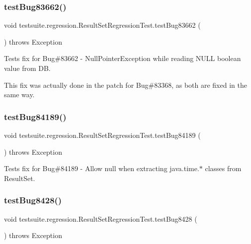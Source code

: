 \subsubsection{\texorpdfstring{test\+Bug83662()}{testBug83662()}}
{\footnotesize\ttfamily void testsuite.\+regression.\+Result\+Set\+Regression\+Test.\+test\+Bug83662 (\begin{DoxyParamCaption}{ }\end{DoxyParamCaption}) throws Exception}

Tests fix for Bug\#83662 -\/ Null\+Pointer\+Exception while reading N\+U\+LL boolean value from DB.

This fix was actually done in the patch for Bug\#83368, as both are fixed in the same way. \mbox{\label{classtestsuite_1_1regression_1_1_result_set_regression_test_af965cfa28edc223aede9f2583526cc38}} 
\subsubsection{\texorpdfstring{test\+Bug84189()}{testBug84189()}}
{\footnotesize\ttfamily void testsuite.\+regression.\+Result\+Set\+Regression\+Test.\+test\+Bug84189 (\begin{DoxyParamCaption}{ }\end{DoxyParamCaption}) throws Exception}

Tests fix for Bug\#84189 -\/ Allow null when extracting java.\+time.$\ast$ classes from Result\+Set. \mbox{\label{classtestsuite_1_1regression_1_1_result_set_regression_test_a195b8d1a9669b382f6b4dc0b8866224c}} 
\subsubsection{\texorpdfstring{test\+Bug8428()}{testBug8428()}}
{\footnotesize\ttfamily void testsuite.\+regression.\+Result\+Set\+Regression\+Test.\+test\+Bug8428 (\begin{DoxyParamCaption}{ }\end{DoxyParamCaption}) throws Exception}

